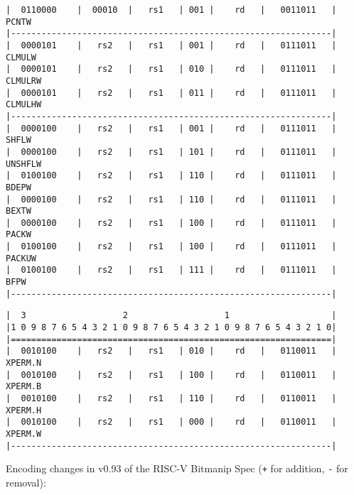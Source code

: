 \begin{minipage}{\linewidth}
\begin{verbatim}
|  0110000    |  00010  |   rs1   | 001 |    rd   |   0011011   |  PCNTW
|---------------------------------------------------------------|
|  0000101    |   rs2   |   rs1   | 001 |    rd   |   0111011   |  CLMULW
|  0000101    |   rs2   |   rs1   | 010 |    rd   |   0111011   |  CLMULRW
|  0000101    |   rs2   |   rs1   | 011 |    rd   |   0111011   |  CLMULHW
|---------------------------------------------------------------|
|  0000100    |   rs2   |   rs1   | 001 |    rd   |   0111011   |  SHFLW
|  0000100    |   rs2   |   rs1   | 101 |    rd   |   0111011   |  UNSHFLW
|  0100100    |   rs2   |   rs1   | 110 |    rd   |   0111011   |  BDEPW
|  0000100    |   rs2   |   rs1   | 110 |    rd   |   0111011   |  BEXTW
|  0000100    |   rs2   |   rs1   | 100 |    rd   |   0111011   |  PACKW
|  0100100    |   rs2   |   rs1   | 100 |    rd   |   0111011   |  PACKUW
|  0100100    |   rs2   |   rs1   | 111 |    rd   |   0111011   |  BFPW
|---------------------------------------------------------------|
\end{verbatim}
\end{minipage}

\begin{minipage}{\linewidth}
\begin{verbatim}
|  3                   2                   1                    |
|1 0 9 8 7 6 5 4 3 2 1 0 9 8 7 6 5 4 3 2 1 0 9 8 7 6 5 4 3 2 1 0|
|===============================================================|
|  0010100    |   rs2   |   rs1   | 010 |    rd   |   0110011   |  XPERM.N
|  0010100    |   rs2   |   rs1   | 100 |    rd   |   0110011   |  XPERM.B
|  0010100    |   rs2   |   rs1   | 110 |    rd   |   0110011   |  XPERM.H
|  0010100    |   rs2   |   rs1   | 000 |    rd   |   0110011   |  XPERM.W
|---------------------------------------------------------------|
\end{verbatim}
\end{minipage}


Encoding changes in v0.93 of the RISC-V Bitmanip Spec ({\tt +} for addition,
{\tt -} for removal):

